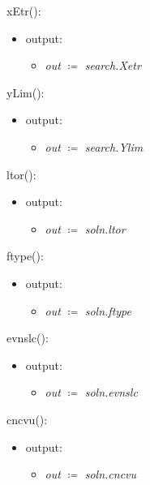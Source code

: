 \documentclass[12pt, titlepage]{article}
\begin{document}
\noindent xEtr():
\begin{itemize}
	\item output:
	\begin{itemize}
		\item[] \textit{out} $\coloneqq$ \textit{search.Xetr}\\
	\end{itemize}
\end{itemize}

\noindent yLim():
\begin{itemize}
	\item output:
	\begin{itemize}
		\item[] \textit{out} $\coloneqq$ \textit{search.Ylim}\\
	\end{itemize}
\end{itemize}

\noindent ltor():
\begin{itemize}
	\item output:
	\begin{itemize}
		\item[] \textit{out} $\coloneqq$ \textit{soln.ltor}\\
	\end{itemize}
\end{itemize}

\noindent ftype():
\begin{itemize}
	\item output:
	\begin{itemize}
		\item[] \textit{out} $\coloneqq$ \textit{soln.ftype}\\
	\end{itemize}
\end{itemize}

\noindent evnslc():
\begin{itemize}
	\item output:
	\begin{itemize}
		\item[] \textit{out} $\coloneqq$ \textit{soln.evnslc}\\
	\end{itemize}
\end{itemize}

\noindent cncvu():
\begin{itemize}
	\item output:
	\begin{itemize}
		\item[] \textit{out} $\coloneqq$ \textit{soln.cncvu}\\
	\end{itemize}
\end{itemize}
\end{document}
